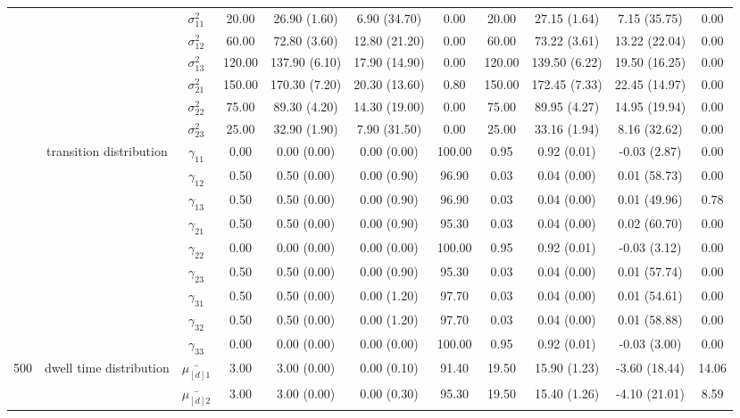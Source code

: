 \begin{table}[h]
{\begin{tabular}{ccccccccccc}
 &  & $\sigma^2_{11}$ & 20.00 & 26.90 (1.60) & 6.90 (34.70) & 0.00 & 20.00 & 27.15 (1.64) & 7.15 (35.75) & 0.00 \\
 &  & $\sigma^2_{12}$ & 60.00 & 72.80 (3.60) & 12.80 (21.20) & 0.00 & 60.00 & 73.22 (3.61) & 13.22 (22.04) & 0.00 \\
 &  & $\sigma^2_{13}$ & 120.00 & 137.90 (6.10) & 17.90 (14.90) & 0.00 & 120.00 & 139.50 (6.22) & 19.50 (16.25) & 0.00 \\
 &  & $\sigma^2_{21}$ & 150.00 & 170.30 (7.20) & 20.30 (13.60) & 0.80 & 150.00 & 172.45 (7.33) & 22.45 (14.97) & 0.00 \\
 &  & $\sigma^2_{22}$ & 75.00 & 89.30 (4.20) & 14.30 (19.00) & 0.00 & 75.00 & 89.95 (4.27) & 14.95 (19.94) & 0.00 \\
 &  & $\sigma^2_{23}$ & 25.00 & 32.90 (1.90) & 7.90 (31.50) & 0.00 & 25.00 & 33.16 (1.94) & 8.16 (32.62) & 0.00 \\
 & transition distribution & $\gamma_{11}$ & 0.00 & 0.00 (0.00) & 0.00 (0.00) & 100.00 & 0.95 & 0.92 (0.01) & -0.03 (2.87) & 0.00 \\
 & \multirow{8}{*}{} & $\gamma_{12}$ & 0.50 & 0.50 (0.00) & 0.00 (0.90) & 96.90 & 0.03 & 0.04 (0.00) & 0.01 (58.73) & 0.00 \\
 &  & $\gamma_{13}$ & 0.50 & 0.50 (0.00) & 0.00 (0.90) & 96.90 & 0.03 & 0.04 (0.00) & 0.01 (49.96) & 0.78 \\
 &  & $\gamma_{21}$ & 0.50 & 0.50 (0.00) & 0.00 (0.90) & 95.30 & 0.03 & 0.04 (0.00) & 0.02 (60.70) & 0.00 \\
 &  & $\gamma_{22}$ & 0.00 & 0.00 (0.00) & 0.00 (0.00) & 100.00 & 0.95 & 0.92 (0.01) & -0.03 (3.12) & 0.00 \\
 &  & $\gamma_{23}$ & 0.50 & 0.50 (0.00) & 0.00 (0.90) & 95.30 & 0.03 & 0.04 (0.00) & 0.01 (57.74) & 0.00 \\
 &  & $\gamma_{31}$ & 0.50 & 0.50 (0.00) & 0.00 (1.20) & 97.70 & 0.03 & 0.04 (0.00) & 0.01 (54.61) & 0.00 \\
 &  & $\gamma_{32}$ & 0.50 & 0.50 (0.00) & 0.00 (1.20) & 97.70 & 0.03 & 0.04 (0.00) & 0.01 (58.88) & 0.00 \\
 &  & $\gamma_{33}$ & 0.00 & 0.00 (0.00) & 0.00 (0.00) & 100.00 & 0.95 & 0.92 (0.01) & -0.03 (3.00) & 0.00 \\ \midrule
500 & dwell time distribution & $\bar{\mu_{[d]1}}$ & 3.00 & 3.00 (0.00) & 0.00 (0.10) & 91.40 & 19.50 & 15.90 (1.23) & -3.60 (18.44) & 14.06 \\
\multirow{26}{*}{} & \multirow{5}{*}{} & $\bar{\mu_{[d]2}}$ & 3.00 & 3.00 (0.00) & 0.00 (0.30) & 95.30 & 19.50 & 15.40 (1.26) & -4.10 (21.01) & 8.59 \\

\end{tabular}}
\end{table}
